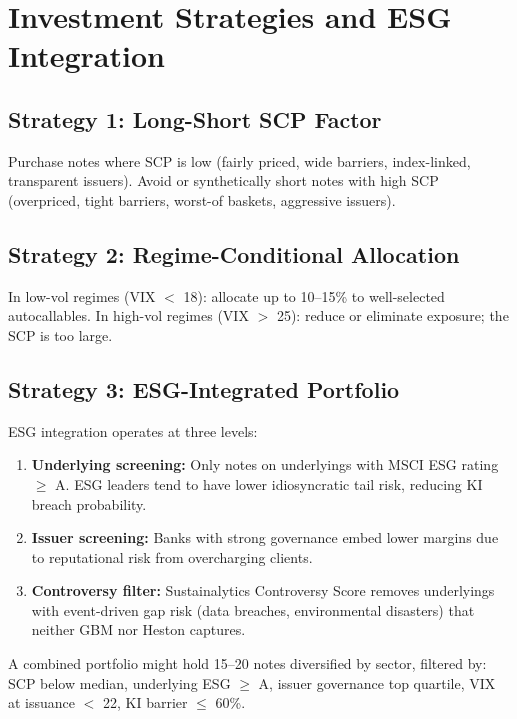 \documentclass[12pt,a4paper]{article}
\begin{document}
\newpage
\section{Investment Strategies and ESG Integration}
\label{sec:strategy}

\subsection{Strategy 1: Long-Short SCP Factor}

Purchase notes where SCP is low (fairly priced, wide barriers, index-linked, transparent issuers). Avoid or synthetically short notes with high SCP (overpriced, tight barriers, worst-of baskets, aggressive issuers).

\subsection{Strategy 2: Regime-Conditional Allocation}

In low-vol regimes (VIX $<$ 18): allocate up to 10--15\% to well-selected autocallables. In high-vol regimes (VIX $>$ 25): reduce or eliminate exposure; the SCP is too large.

\subsection{Strategy 3: ESG-Integrated Portfolio}

ESG integration operates at three levels:
\begin{enumerate}[leftmargin=2cm]
    \item \textbf{Underlying screening:} Only notes on underlyings with MSCI ESG rating $\geq$ A. ESG leaders tend to have lower idiosyncratic tail risk, reducing KI breach probability.
    \item \textbf{Issuer screening:} Banks with strong governance embed lower margins due to reputational risk from overcharging clients.
    \item \textbf{Controversy filter:} Sustainalytics Controversy Score removes underlyings with event-driven gap risk (data breaches, environmental disasters) that neither GBM nor Heston captures.
\end{enumerate}

A combined portfolio might hold 15--20 notes diversified by sector, filtered by: SCP below median, underlying ESG $\geq$ A, issuer governance top quartile, VIX at issuance $<$ 22, KI barrier $\leq$ 60\%.
\end{document}
